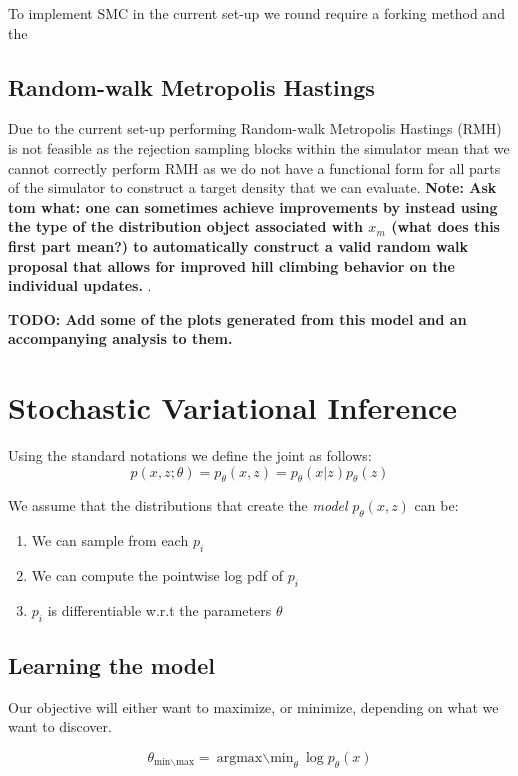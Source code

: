 \documentclass{article}
\begin{document}
To implement SMC in the current set-up we round require a forking method and the 

\subsection{Random-walk Metropolis Hastings}

Due to the current set-up performing Random-walk Metropolis Hastings (RMH) is not feasible 
as the rejection sampling blocks within the simulator mean that we cannot correctly perform RMH
as we do not have a functional form for all parts of the simulator to construct a target density
that we can evaluate. \textbf{Note:
Ask tom what:  one can sometimes achieve improvements by instead using the type of the distribution object 
associated with $x_m$ (what does this first part mean?) 
 to automatically construct a valid random walk proposal that allows for improved
 hill climbing behavior on the individual updates. }. 

\textbf{TODO: Add some of the plots generated from this model and an accompanying analysis to them.}
 

\section{Stochastic Variational Inference}

Using the standard notations we define the joint as follows:
\begin{equation}
  p(x, z ; \theta) = p_{\theta}(x,z) = p_{\theta}(x| z)p_{\theta}(z)
\end{equation}


We assume that the distributions that create the \emph{model} $p_{\theta}(x, z)$ can be:
\begin{enumerate}
  \item We can sample from each $p_i$
  \item We can compute the pointwise log pdf of $p_i$
  \item $p_i$ is differentiable w.r.t the parameters $\theta$
  \end{enumerate}

\subsection{Learning the model}

Our objective will either want to maximize, or minimize, depending on what we want to discover. 

\begin{equation}
  \theta_{\text{min} \backslash \text{max} } = \text{argmax$\backslash$min}_{\theta}\log p_\theta(x)
\end{equation}
\end{document}
